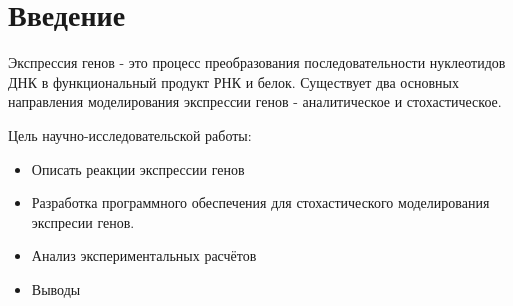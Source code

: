 \section*{Введение}
Экспрессия генов - это процесс преобразования последовательности нуклеотидов ДНК в функциональный продукт РНК и белок. Существует два основных направления моделирования экспрессии генов - аналитическое и
стохастическое. 

Цель научно-исследовательской работы:
\begin{itemize}
    \item Описать реакции экспрессии генов
    \item Разработка программного обеспечения для стохастического моделирования
    экспресии генов.
    \item Анализ экспериментальных расчётов
    \item Выводы
\end{itemize}
